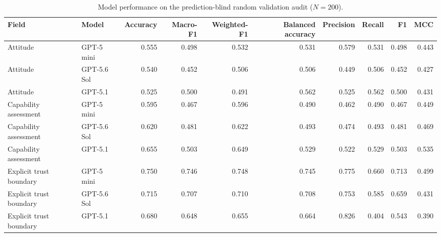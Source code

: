 \begin{table}
\caption{Model performance on the prediction-blind random validation audit ($N=200$).}
\label{tab:model-performance-random-audit-200}
\begin{tabular}{llrrrrrrrr}
\toprule
Field & Model & Accuracy & Macro-F1 & Weighted-F1 & Balanced accuracy & Precision & Recall & F1 & MCC \\
\midrule
Attitude & GPT-5 mini & 0.555 & 0.498 & 0.532 & 0.531 & 0.579 & 0.531 & 0.498 & 0.443 \\
Attitude & GPT-5.6 Sol & 0.540 & 0.452 & 0.506 & 0.506 & 0.449 & 0.506 & 0.452 & 0.427 \\
Attitude & GPT-5.1 & 0.525 & 0.500 & 0.491 & 0.562 & 0.525 & 0.562 & 0.500 & 0.431 \\
Capability assessment & GPT-5 mini & 0.595 & 0.467 & 0.596 & 0.490 & 0.462 & 0.490 & 0.467 & 0.449 \\
Capability assessment & GPT-5.6 Sol & 0.620 & 0.481 & 0.622 & 0.493 & 0.474 & 0.493 & 0.481 & 0.469 \\
Capability assessment & GPT-5.1 & 0.655 & 0.503 & 0.649 & 0.529 & 0.522 & 0.529 & 0.503 & 0.535 \\
Explicit trust boundary & GPT-5 mini & 0.750 & 0.746 & 0.748 & 0.745 & 0.775 & 0.660 & 0.713 & 0.499 \\
Explicit trust boundary & GPT-5.6 Sol & 0.715 & 0.707 & 0.710 & 0.708 & 0.753 & 0.585 & 0.659 & 0.431 \\
Explicit trust boundary & GPT-5.1 & 0.680 & 0.648 & 0.655 & 0.664 & 0.826 & 0.404 & 0.543 & 0.390 \\
\bottomrule
\end{tabular}
\end{table}
